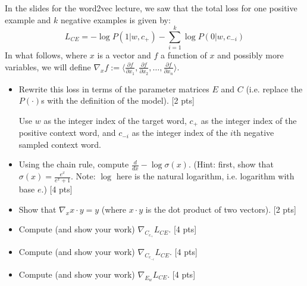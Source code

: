 \documentclass[11pt]{article}
\begin{document}
\vspace{2em}
  In the slides for the word2vec lecture, we saw that the total loss for one positive example and $k$ negative examples is given by:
$$ L_{CE} = -\log P(1 | w, c_+) - \sum_{i=1}^k \log P(0 | w, c_{-i})$$
In what follows, where $x$ is a vector and $f$ a function of $x$ and possibly more variables, we will define $\nabla_x f := \langle \frac{\partial f}{\partial x_1} , \frac{\partial f}{\partial x_2}, \dots , \frac{\partial f}{\partial x_n} \rangle$.
\begin{itemize}
  \item Rewrite this loss in terms of the parameter matrices $E$ and $C$ (i.e. replace the $P(\cdot)$s with the definition of the model). [2 pts]

        Use $w$ as the integer index of the target word, $c_+$ as the integer index of the positive context word, and $c_{-i}$ as the integer index of the $i$th negative sampled context word.
  \item Using the chain rule, compute $\frac{d}{dx} -\log\sigma(x)$.  (Hint: first, show that $\sigma(x) = \frac{e^x}{e^x+1}$.  Note: $\log$ here is the natural logarithm, i.e. logarithm with base $e$.) [4 pts]
  \item Show that $\nabla_x x \cdot y = y$ (where $x \cdot y$ is the dot product of two vectors). [2 pts]
  \item Compute (and show your work) $\nabla_{C_{c_+}} L_{CE}$. [4 pts]
  \item Compute (and show your work) $\nabla_{C_{c_{-i}}} L_{CE}$. [4 pts]
  \item Compute (and show your work) $\nabla_{E_w} L_{CE}$. [4 pts]
\end{itemize}
\end{document}
